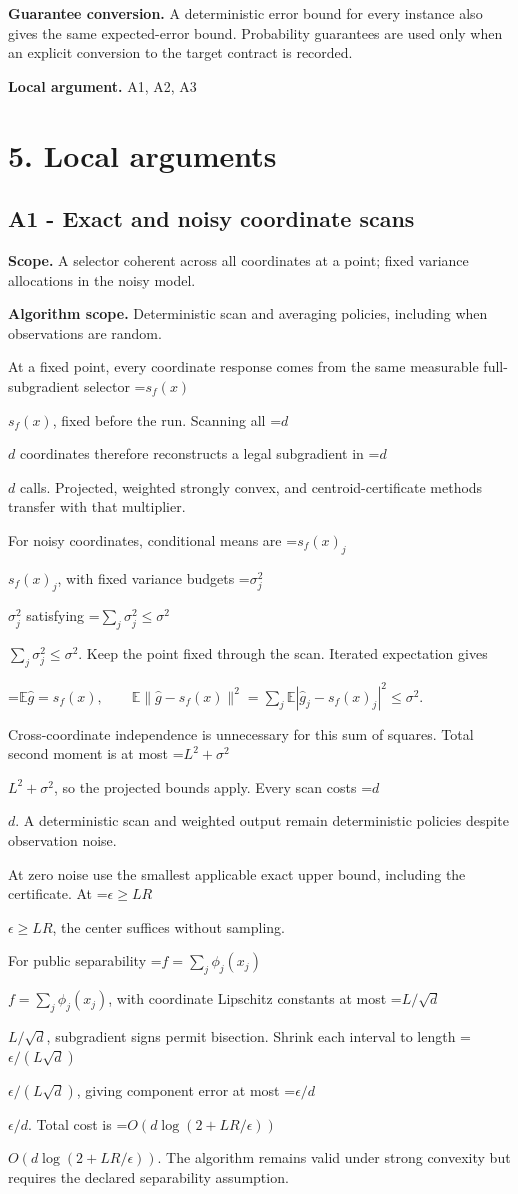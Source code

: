 \documentclass[10pt,a4paper]{article}
\newcommand{\AtlasMath}[1]{\par\begingroup\centering\setbox0=\hbox{$\displaystyle #1$}\ifdim\wd0>1.4\linewidth\typeout{ATLAS WIDE FORMULA: \the\wd0}\fi\ifdim\wd0>\linewidth\resizebox{\linewidth}{!}{\box0}\else\box0\fi\par\endgroup}
\newcommand{\AtlasInlineMath}[1]{\begingroup\setbox0=\hbox{$#1$}\ifdim\wd0>.4\linewidth\endgroup\AtlasMath{#1}\else\endgroup$#1$\fi}
\begin{document}
\textbf{Guarantee conversion.} A deterministic error bound for every instance also gives the same expected-error bound. Probability guarantees are used only when an explicit conversion to the target contract is recorded.

\textbf{Local argument.} A1, A2, A3

\section{5. Local arguments}
\subsection{A1 - Exact and noisy coordinate scans}
\textbf{Scope.} A selector coherent across all coordinates at a point; fixed variance allocations in the noisy model.

\textbf{Algorithm scope.} Deterministic scan and averaging policies, including when observations are random.

At a fixed point, every coordinate response comes from the same measurable full-subgradient selector \AtlasInlineMath{s_f(x)}, fixed before the run. Scanning all \AtlasInlineMath{d} coordinates therefore reconstructs a legal subgradient in \AtlasInlineMath{d} calls. Projected, weighted strongly convex, and centroid-certificate methods transfer with that multiplier.

For noisy coordinates, conditional means are \AtlasInlineMath{s_f(x)_j}, with fixed variance budgets \AtlasInlineMath{\sigma_j^2} satisfying \AtlasInlineMath{\sum_j\sigma_j^2\le\sigma^2}. Keep the point fixed through the scan. Iterated expectation gives

\AtlasMath{\mathbb E\widehat g=s_f(x),\qquad
\mathbb E\|\widehat g-s_f(x)\|^2
=\sum_j\mathbb E|\widehat g_j-s_f(x)_j|^2\le\sigma^2.}

Cross-coordinate independence is unnecessary for this sum of squares. Total second moment is at most \AtlasInlineMath{L^2+\sigma^2}, so the projected bounds apply. Every scan costs \AtlasInlineMath{d}. A deterministic scan and weighted output remain deterministic policies despite observation noise.

At zero noise use the smallest applicable exact upper bound, including the certificate. At \AtlasInlineMath{\epsilon\ge LR}, the center suffices without sampling.

For public separability \AtlasInlineMath{f=\sum_j\phi_j(x_j)}, with coordinate Lipschitz constants at most \AtlasInlineMath{L/\sqrt d}, subgradient signs permit bisection. Shrink each interval to length \AtlasInlineMath{\epsilon/(L\sqrt d)}, giving component error at most \AtlasInlineMath{\epsilon/d}. Total cost is \AtlasInlineMath{O(d\log(2+LR/\epsilon))}. The algorithm remains valid under strong convexity but requires the declared separability assumption.
\end{document}
